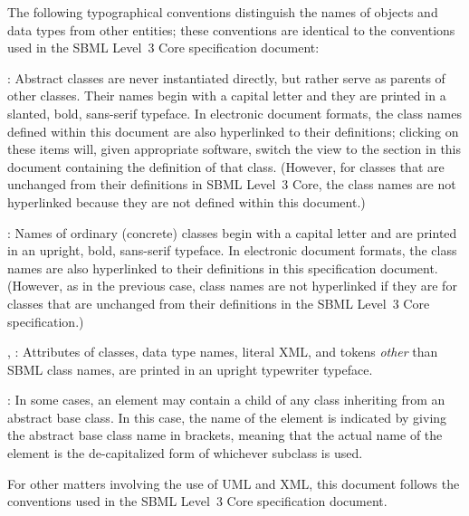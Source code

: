 The following typographical conventions distinguish the names of objects and data types from other entities; these conventions are identical to the conventions used in the SBML Level~3 Core specification document:

\begin{description}
  
\item {}: Abstract classes are never instantiated directly, but rather serve as parents of other classes.  Their names begin with a capital letter and they are printed in a slanted, bold, sans-serif typeface.  In electronic document formats, the class names defined within this document are also hyperlinked to their definitions; clicking on these items will, given appropriate software, switch the view to the section in this document containing the definition of that class.  (However, for classes that are unchanged from their definitions in SBML Level~3 Core, the class names are not hyperlinked because they are not defined within this document.)
  
\item {}: Names of ordinary (concrete) classes begin with a capital letter and are printed in an upright, bold, sans-serif typeface.  In electronic document formats, the class names are also hyperlinked to their definitions in this specification document.  (However, as in the previous case, class names are not hyperlinked if they are for classes that are unchanged from their definitions in the SBML Level~3 Core specification.)

\item \emph{}, : Attributes of classes, data type names, literal XML, and tokens \emph{other} than SBML class names, are printed in an upright typewriter typeface.

\item \token{[elementName]}:  In some cases, an element may contain a child of any class inheriting from an abstract base class.  In this case, the name of the element is indicated by giving the abstract base class name in brackets, meaning that the actual name of the element is the de-capitalized form of whichever subclass is used.

\end{description}

For other matters involving the use of UML and XML, this document follows the conventions used in the SBML Level~3 Core specification document.
